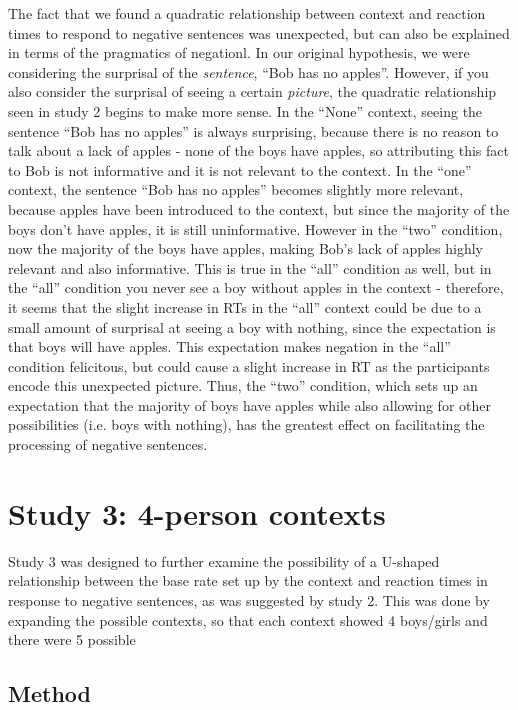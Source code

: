\documentclass[man]{apa2}
\begin{document}
The fact that we found a quadratic relationship between context and reaction times to respond to negative sentences was unexpected, but can also be explained in terms of the pragmatics of negationl.  In our original hypothesis, we were considering the surprisal of the \emph{sentence}, ``Bob has no apples''.  However, if you also consider the surprisal of seeing a certain \emph{picture}, the quadratic relationship seen in study 2 begins to make more sense.  In the ``None'' context, seeing the sentence ``Bob has no apples'' is always surprising, because there is no reason to talk about a lack of apples - none of the boys have apples, so attributing this fact to Bob is not informative and it is not relevant to the context.  In the ``one'' context, the sentence ``Bob has no apples'' becomes slightly more relevant, because apples have been introduced to the context, but since the majority of the boys don't have apples, it is still uninformative.  However in the ``two'' condition, now the majority of the boys have apples, making Bob's lack of apples highly relevant and also informative.  This is true in the ``all'' condition as well, but in the ``all'' condition you never see a boy without apples in the context - therefore, it seems that the slight increase in RTs in the ``all'' context could be due to a small amount of surprisal at seeing a boy with nothing, since the expectation is that boys will have apples.  This expectation makes negation in the ``all'' condition felicitous, but could cause a slight increase in RT as the participants encode this unexpected picture.  Thus, the ``two'' condition, which sets up an expectation that the majority of boys have apples while also allowing for other possibilities (i.e. boys with nothing), has the greatest effect on facilitating the processing of negative sentences. 

\section{Study 3: 4-person contexts}
Study 3 was designed to further examine the possibility of a U-shaped relationship between the base rate set up by the context and reaction times in response to negative sentences, as was suggested by study 2.  This was done by expanding the possible contexts, so that each context showed 4 boys/girls and there were 5 possible 

\subsection{Method}
\end{document}
